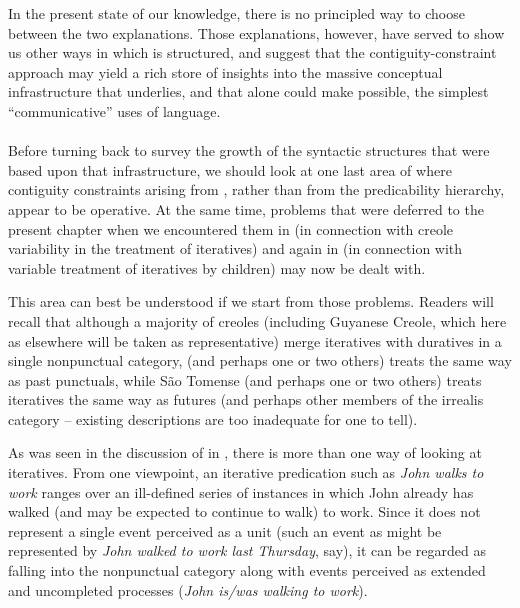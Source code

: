 In the present state of our knowledge, there is no principled way to choose between the two explanations. Those explanations, however, have served to show us other ways in which  is struc\-tured, and suggest that the contiguity-constraint approach may yield a rich store of insights into the massive conceptual infrastructure that underlies, and that alone could make possible, the simplest ``communi\-cative'' uses of language.\\\\

Before turning back to survey the growth of the syntactic struc\-tures that were based upon that infrastructure, we should look at one last area of  where contiguity constraints arising from , rather than from the predicability hierarchy, appear to be operative. At the same time, problems that were deferred to the present chapter when we encountered them in  (in connection with creole variability in the treatment of iteratives) and again in  (in connection with variable treatment of iteratives by children) may now be dealt with.

This area can best be understood if we start from those problems. Readers will recall that although a majority of creoles (including Guyanese Creole, which here as elsewhere will be taken as representative) merge iteratives with duratives in a single nonpunctual category,
 (and perhaps one or two others) treats  the same way as past punctuals, while S{\~a}o Tomense (and perhaps one or two others) treats iteratives the same way as futures (and perhaps other members of the irrealis category -- existing descriptions are too inadequate for one to tell).

As was seen in the discussion of \citet{BrockartEtAl1973} in , there is more than one way of looking at iteratives. From one viewpoint, an iterative predication such as \textit{John walks to work} ranges over an ill-defined series of instances in which John already has walked (and may be expected to continue to walk) to work. Since it does not represent a single event perceived as a unit (such an event as might be represented by \textit{John walked to work last Thursday}, say), it can be regarded as falling into the nonpunctual category along with events perceived as extended and uncompleted processes (\textit{John is/was walking to work}).

